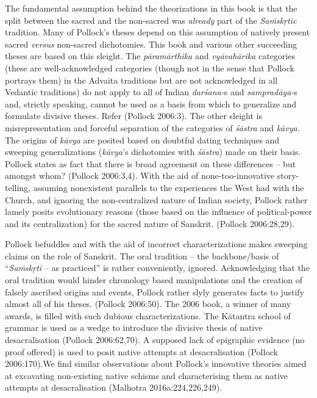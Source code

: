 The fundamental assumption behind the theorizations in this book is that the split between the sacred and the non-sacred was \textit{already} part of the \textit{Saṁskṛtic} tradition. Many of Pollock's theses depend on this assumption of natively present sacred \textit{versus} non-sacred dichotomies. This book and various other succeeding theses are based on this sleight. The \textit{pāramārthika} and \textit{vyāvahārika} categories (these are well-acknowledged categories (though not in the sense that Pollock portrays them) in the Advaita traditions but are not acknowledged in all Vedantic traditions) do not apply to all of Indian \textit{darśana-}s and \textit{sampradāya-}s and, strictly speaking, cannot be used as a basis from which to generalize and formulate divisive theses. Refer (Pollock 2006:3). The other sleight is misrepresentation and forceful separation of the categories of \textit{śāstra} and \textit{kāvya}. The origins of \textit{kāvya} are posited based on doubtful dating techniques and sweeping generalizations (\textit{kāvya}'s dichotomies with \textit{śāstra}) made on their basis. Pollock states as fact that there is broad agreement on these differences – but amongst whom? (Pollock 2006:3,4). With the aid of none-too-innovative story-telling, assuming nonexistent parallels to the experiences the West had with the Church, and ignoring the non-centralized nature of Indian society, Pollock rather lamely posits evolutionary reasons (those based on the influence of political-power and its centralization) for the sacred nature of Sanskrit. (Pollock 2006:28,29).

Pollock befuddles and with the aid of incorrect characterizations makes sweeping claims on the role of Sanskrit. The oral tradition – the backbone/basis of “\textit{Saṁskṛti} – as practiced” is rather conveniently, ignored. Acknowledging that the oral tradition would hinder chronology based manipulations and the creation of falsely ascribed origins and events, Pollock rather slyly generates facts to justify almost all of his theses. (Pollock 2006:50). The 2006 book, a winner of many awards, is filled with such dubious characterizations. The Kātantra school of grammar is used as a wedge to introduce the divisive thesis of native desacralisation (Pollock 2006:62,70). A supposed lack of epigraphic evidence (no proof offered) is used to posit native attempts at desacralisation (Pollock 2006:170).We find similar observations about Pollock's innovative theories aimed at excavating non-existing native schisms and characterising them as native attempts at desacralisation (Malhotra 2016a:224,226,249).

